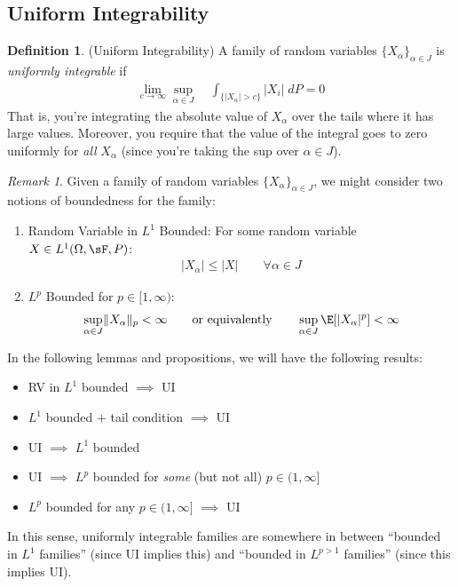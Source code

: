 \documentclass[12pt]{article}
\theoremstyle{plain}
\theoremstyle{definition}
\newtheorem{defn}[thm]{Definition}
\theoremstyle{remark}
\newtheorem*{rmk}{Remark}
\newcommand{\ra}{\rightarrow}
\begin{document}
\clearpage
\subsection{Uniform Integrability}

\begin{defn}(Uniform Integrability)
A family of random variables $\{X_\alpha\}_{\alpha \in J}$ is
\emph{uniformly integrable} if
\begin{align*}
  \lim_{c\ra\infty} \sup_{\alpha\in J}\quad
  \int_{\{|X_\alpha|>c\}}
  |X_i|\; dP = 0
\end{align*}
That is, you're integrating the absolute value of $X_\alpha$ over the
tails where it has large values. Moreover, you require that the value
of the integral goes to zero uniformly for \emph{all} $X_\alpha$ (since
you're taking the sup over $\alpha \in J$).
\end{defn}

\begin{rmk}
Given a family of random variables $\{X_\alpha\}_{\alpha \in J}$, we
might consider two notions of boundedness for the family:
\begin{enumerate}[label=(\roman*)]
  \item Random Variable in $L^1$ Bounded: For some random variable
    $X\in L^1(\Omega,\sF,P)$:
    \begin{align*}
      |X_\alpha|\leq |X|
      \qquad \forall \alpha \in J
    \end{align*}

  \item $L^p$ Bounded for $p\in[1,\infty)$:
    \begin{align*}
      \sup_{\alpha\in J} \lVert X_\alpha\rVert_p<\infty
      \qquad\text{or equivalently}\qquad
      \sup_{\alpha\in J} \E[|X_\alpha|^p]<\infty
    \end{align*}
\end{enumerate}
In the following lemmas and propositions, we will have the following
results:
\begin{itemize}
  \item RV in $L^1$ bounded $\implies$ UI
  \item $L^1$ bounded + tail condition $\implies$ UI
  \item UI $\implies$ $L^1$ bounded
  \item UI $\implies$ $L^p$ bounded for \emph{some} (but not all)
    $p \in (1,\infty]$
  \item $L^p$ bounded for any $p\in(1,\infty]$ $\implies$ UI
\end{itemize}
In this sense, uniformly integrable families are somewhere in between
``bounded in $L^1$ families'' (since UI implies this) and ``bounded in
$L^{p>1}$ families'' (since this implies UI).
\end{rmk}
\end{document}

